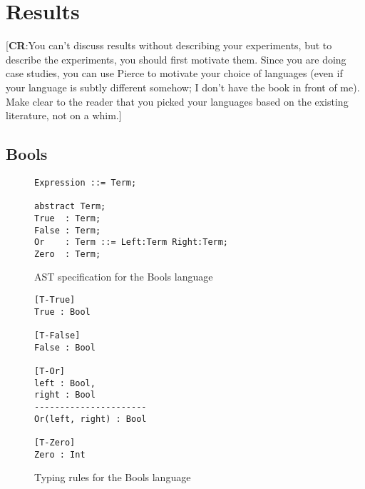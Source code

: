 \documentclass[nofilelist]{cslthse-msc}
\newcommand{\CR}[1]{\textcolor{green!60!black}{[\textbf{CR}:#1]}}
\begin{document}
\section{Results} %
\CR{You can't discuss results without describing your experiments, but to describe the experiments, you should first motivate them.
  Since you are doing case studies, you can use Pierce to motivate your choice of languages (even if your language is subtly different somehow; I don't have the book in front of me).
  Make clear to the reader that you picked your languages based on the existing literature, not on a whim.}
\subsection{Bools}

\begin{figure}[h]
\begin{lstlisting}[]
Expression ::= Term;

abstract Term;
True  : Term;
False : Term;
Or    : Term ::= Left:Term Right:Term;
Zero  : Term;
\end{lstlisting}
  \caption{AST specification for the Bools language}
  \label{boolsast}
\end{figure}
\begin{figure}[h]
\begin{lstlisting}[]
[T-True]
True : Bool

[T-False]
False : Bool

[T-Or]
left : Bool,
right : Bool
----------------------
Or(left, right) : Bool

[T-Zero]
Zero : Int
\end{lstlisting}
  \caption{Typing rules for the Bools language}
  \label{boolstr}
\end{figure}
\end{document}
